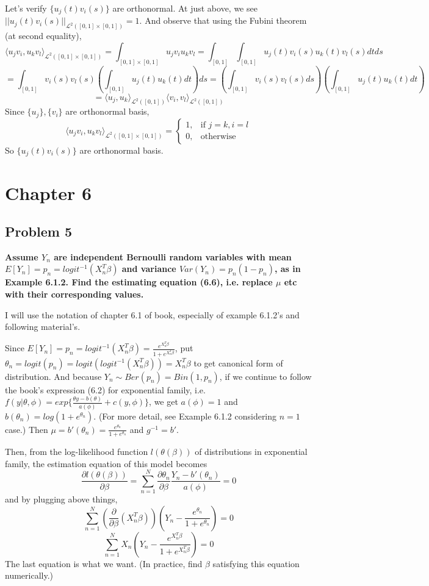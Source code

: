 \documentclass{article}
\begin{document}
Let's verify $\{u_j(t)v_i(s)\}$ are orthonormal. At just above, we see $||u_j(t)v_i(s)||_{\mathcal{L}^2([0,1]\times[0,1])}=1$.
And observe that using the Fubini theorem (at second equality),
\[\langle u_jv_i, u_kv_l \rangle_{\mathcal{L}^2([0,1]\times[0,1])} =\int_{[0,1]\times[0,1]} u_jv_iu_kv_l = \int_{[0,1]}\int_{[0,1]} u_j(t)v_i(s)u_k(t)v_l(s)dt ds\]
\[=\int_{[0,1]} v_i(s)v_l(s) (\int_{[0,1]} u_j(t)u_k(t) dt) ds=(\int_{[0,1]} v_i(s)v_l(s)ds) (\int_{[0,1]} u_j(t)u_k(t) dt) \]
\[= \langle u_j, u_k \rangle_{\mathcal{L}^2([0,1])} \langle v_i, v_l \rangle_{\mathcal{L}^2([0,1])}\]
Since $\{u_j\}, \{v_i\}$ are orthonormal basis, 
\[
    \langle u_jv_i, u_kv_l \rangle_{\mathcal{L}^2([0,1]\times[0,1])}=
\begin{cases}
    1, & \text{if } j=k,i=l \\ 
    0, & \text{otherwise}
\end{cases}
\]
So $\{u_j(t)v_i(s)\}$ are orthonormal basis.

\section{Chapter 6}
\subsection{Problem 5}
\textbf{
Assume $Y_n$ are independent Bernoulli random variables with mean $E[Y_n]=p_n=logit^{-1}(X_n^T\beta)$ and 
variance $Var(Y_n)=p_n(1-p_n)$, as in Example 6.1.2.
Find the estimating equation (6.6), i.e. replace $\mu$ etc with their corresponding values.
}

I will use the notation of chapter 6.1 of book, especially of example 6.1.2's and following material's.

Since $E[Y_n]=p_n=logit^{-1}(X_n^T\beta)=\frac{e^{X_n^T\beta}}{1+e^{X_n^T\beta}}$, 
put $\theta_n=logit(p_n)=logit(logit^{-1}(X_n^T\beta))=X_n^T\beta$ to get canonical form of distribution.
And because $Y_n\sim Ber(p_n) = Bin(1,p_n)$, if we continue to follow the book's expression (6.2) for exponential family, 
i.e. \(f(y|\theta,\phi)=exp\{\frac{\theta y - b(\theta)}{a(\phi)} + c(y,\phi)\}\), we get
$a(\phi)=1$ and $b(\theta_n)=log(1+e^{\theta_n})$.
(For more detail, see Example 6.1.2 considering $n=1$ case.)
Then $\mu=b'(\theta_n)=\frac{e^{\theta_n}}{1+e^{\theta_n}}$ and $g^{-1}=b'$.

Then, from the log-likelihood function $l(\theta(\beta))$ of distributions in exponential family, 
the estimation equation of this model becomes
\[\frac{\partial l(\theta(\beta))}{\partial\beta} = \sum_{n=1}^N \frac{\partial\theta_n}{\partial\beta} \frac{Y_n-b'(\theta_n)}{a(\phi)}=0\]
and by plugging above things,
\[\sum_{n=1}^N (\frac{\partial}{\partial\beta}(X_n^T\beta)) (Y_n-\frac{e^{\theta_n}}{1+e^{\theta_n}})=0\]
\[\sum_{n=1}^N X_n(Y_n-\frac{e^{X_n^T\beta}}{1+e^{X_n^T\beta}})=0\]
The last equation is what we want. (In practice, find $\beta$ satisfying this equation numerically.)
\end{document}
